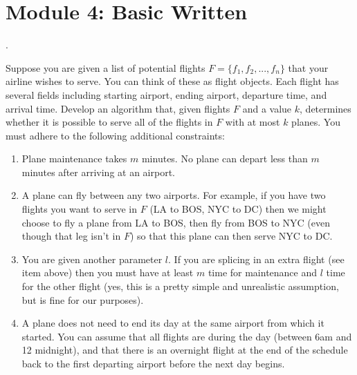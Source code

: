 \documentclass[12pt]{article}
\def\homework{Module 4: Basic Written}
\newcounter{quesnum}
\newcommand{\question}[2][??]{
\begin{list}{\labelitemi}{\leftmargin=2em}
\item [\arabic{quesnum}.] {#2}
\end{list}
\addtocounter{quesnum}{1}
}
\begin{document}
\section*{\homework}



\question[3]{
Suppose you are given a list of potential flights $F=\{f_1,f_2,...,f_n\}$ that your airline wishes to serve. You can think of these as flight objects. Each flight has several fields including starting airport, ending airport, departure time, and arrival time. Develop an algorithm that, given flights $F$ and a value $k$, determines whether it is possible to serve all of the flights in $F$ with at most $k$ planes. You must adhere to the following additional constraints:

\begin{enumerate}
\item Plane maintenance takes $m$ minutes. No plane can depart less than $m$ minutes after arriving at an airport.
\item A plane can fly between any two airports. For example, if you have two flights you want to serve in $F$ (LA to BOS, NYC to DC) then we might choose to fly a plane from LA to BOS, then fly from BOS to NYC (even though that leg isn't in $F$) so that this plane can then serve NYC to DC.
\item  You are given another parameter $l$. If you are splicing in an extra flight (see item above) then you must have at least $m$ time for maintenance and $l$ time for the other flight (yes, this is a pretty simple and unrealistic assumption, but is fine for our purposes).
\item A plane does not need to end its day at the same airport from which it started. You can assume that all flights are during the day (between 6am and 12 midnight), and that there is an overnight flight at the end of the schedule back to the first departing airport before the next day begins.
\end{enumerate}

}



\end{document}
